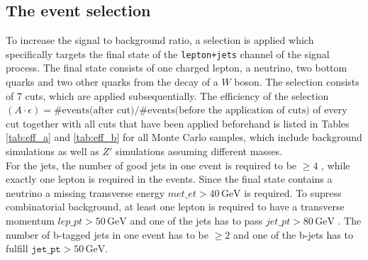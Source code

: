 \subsection{The event selection}
To increase the signal to background ratio, a selection is applied which specifically targets the final state of the \texttt{lepton+jets}
channel of the signal process.
The final state consists of one charged lepton, a neutrino, two bottom quarks and two other quarks from the
decay of a $W$ boson. The selection consists of 7 cuts, which are applied subsequentially.
The efficiency of the selection $(A \cdot \epsilon) = \# \text{events(after cut)} / \# \text{events(before the application of cuts)}$ of every cut together with all
cuts that have been applied beforehand is listed in Tables \ref{tab:eff_a} and \ref{tab:eff_b} for all Monte Carlo samples, which include background simulations as well as $Z\prime$ simulations assuming different masses.\\
For the jets, the number of good jets in one event is required to be $\geq 4$
, while exactly one lepton is required
in the events. Since the final state contains a neutrino
a missing
transverse energy $met\_et > 40 \, \si{\giga\eV}$
 is required. To supress combinatorial background,
at least one lepton is required to have a transverse momentum $lep\_pt > 50 \, \si{\giga\eV}$
 and one of
the jets has to pass $jet\_pt > 80 \, \si{\giga\eV}$
. The number of b-tagged jets in one event has to be
$\geq 2$
 and one of the b-jets has to fulfill $\texttt{jet\_pt} > 50 \, \si{\giga\eV}$.%
